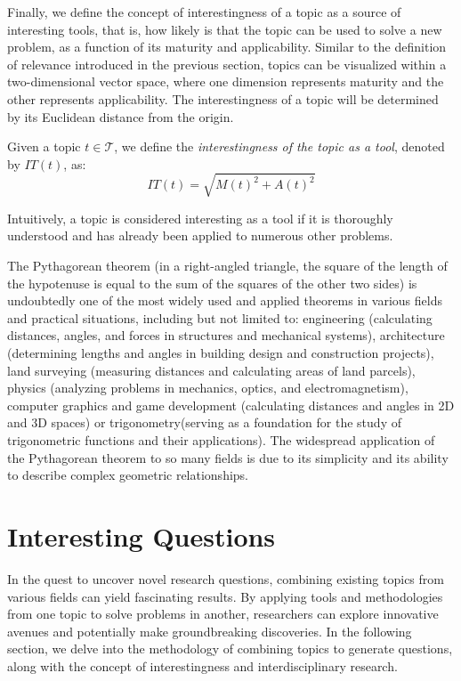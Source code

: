 Finally, we define the concept of interestingness of a topic as a source of interesting tools, that is, how likely is that the topic can be used to solve a new problem, as a function of its maturity and applicability. Similar to the definition of relevance introduced in the previous section, topics can be visualized within a two-dimensional vector space, where one dimension represents maturity and the other represents applicability. The interestingness of a topic will be determined by its Euclidean distance from the origin.

\begin{definition}
Given a topic $t \in \mathcal{T}$, we define the \emph{interestingness of the topic as a tool}, denoted by $IT(t)$, as:
\[
IT(t) = \sqrt{ M(t)^2 +  A(t)^2 }
\]
\end{definition}

Intuitively, a topic is considered interesting as a tool if it is thoroughly understood and has already been applied to numerous other problems.

\begin{example}
The Pythagorean theorem (in a right-angled triangle, the square of the length of the hypotenuse is equal to the sum of the squares of the other two sides) is undoubtedly one of the most widely used and applied theorems in various fields and practical situations, including but not limited to: engineering (calculating distances, angles, and forces in structures and mechanical systems), architecture (determining lengths and angles in building design and construction projects), land surveying (measuring distances and calculating areas of land parcels), physics (analyzing problems in mechanics, optics, and electromagnetism), computer graphics and game development (calculating distances and angles in 2D and 3D spaces) or trigonometry(serving as a foundation for the study of trigonometric functions and their applications). The widespread application of the Pythagorean theorem to so many fields is due to its simplicity and its ability to describe complex geometric relationships.
\end{example}


%
%

\section{Interesting Questions}

In the quest to uncover novel research questions, combining existing topics from various fields can yield fascinating results. By applying tools and methodologies from one topic to solve problems in another, researchers can explore innovative avenues and potentially make groundbreaking discoveries. In the following section, we delve into the methodology of combining topics to generate questions, along with the concept of interestingness and interdisciplinary research.

